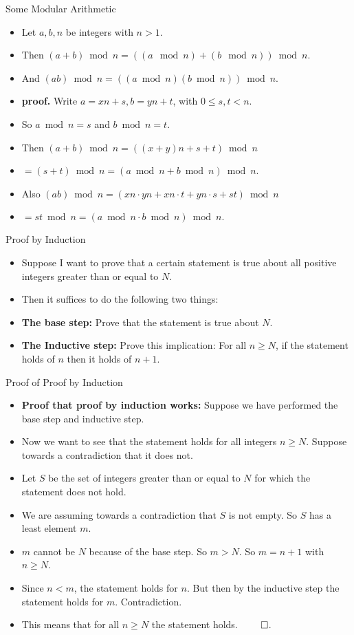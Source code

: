 \documentclass[handout]{beamer}
\begin{document}
\begin{frame}{Some Modular Arithmetic}
\begin{itemize}
  \item Let $a,b,n$ be integers with $n>1$.
  \item Then $(a+b) \bmod n = \left((a\mod n) + (b\mod n)\right) \bmod n$.
  \item And $(ab) \bmod n = \left ( (a\bmod n)(b \bmod n) \right) \bmod n$.
  \item \textbf{proof.} Write $a=xn+s, b=yn+t$, with $0\leq s,t < n$.
  \item So $a\bmod n = s$ and $b\bmod n = t$.
  \item Then $(a+b) \bmod n = \left((x +y)n  + s+t\right) \bmod n$
  \item $= (s+t)\bmod n = (a\bmod n + b \bmod n) \bmod n$.
  \item Also $(ab)\bmod n = (xn\cdot yn + xn\cdot t + yn\cdot s + st) \bmod n$
  \item $=st \bmod n = (a\bmod n \cdot b \bmod n) \bmod n.$
\end{itemize}
\end{frame}

\begin{frame}{Proof by Induction}
\begin{itemize}
  \item Suppose I want to prove that a certain statement is true about all positive integers greater than  or equal to $N$.
  \item Then it suffices to do the following two things:
  \item \textbf{The base step:} Prove that the statement is true about $N$.
  \item \textbf{The Inductive step:} Prove this implication: For all $n\geq N$, if the statement holds of $n$ then it holds of $n+1$.
\end{itemize}
\end{frame}

\begin{frame}{Proof of  Proof by Induction}
\begin{itemize}
  \item \textbf{Proof that proof by induction works:} Suppose we have performed the base step and inductive step.
  \item Now we want to see that the statement holds for all integers $n\geq N$. Suppose towards a contradiction that it does not.
  \item Let $S$ be the set of integers greater than or equal to $N$ for which the statement does not hold.
  \item We are assuming towards a contradiction that $S$ is not empty. So $S$ has a least element $m$.
  \item $m$ cannot be $N$ because of the base step. So $m>N$. So $m=n+1$ with $n\geq N$.
  \item Since $n<m$, the statement holds for $n$. But then by the inductive step the statement holds for $m$. Contradiction.
  \item This means that for all $n\geq N$ the statement holds. $\qed$.
\end{itemize}
\end{frame}
\end{document}

